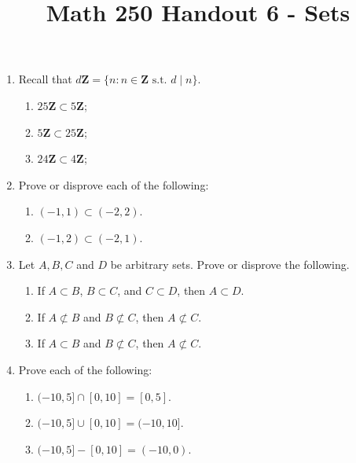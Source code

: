 \documentclass[12pt, reqno]{amsart}
\begin{document}
\title[Math 250 Handout 6 - Sets]{Math 250 Handout 6 - Sets}\maketitle

\begin{enumerate}
\item Recall that $d\mathbf{Z} = \{n : n \in \mathbf{Z} \text{ s.t. } d \mid n
 \}$.
 \begin{enumerate}
 \item $25\mathbf{Z} \subset 5 \mathbf{Z}$;
 \item $5\mathbf{Z} \subset 25\mathbf{Z}$;
 \item $24\mathbf{Z} \subset 4 \mathbf{Z}$; 

 \end{enumerate}
 \vspace{10pt}

\item Prove or disprove each of the following:
 \begin{enumerate}
 \item $(-1,1) \subset (-2,2)$. 
 \item $(-1,2) \subset (-2,1)$.
 \end{enumerate}
 \vspace{10pt} 

 
\item Let $A,B,C$ and $D$ be arbitrary sets. Prove or disprove the following.
 \begin{enumerate}
 \item If $A \subset B$, $B \subset C$, and $C \subset D$, then $A \subset D$.
 \item If $A \not \subset B$ and $B \not \subset C$, then $A \not \subset C$.
 \item If $A \subset B$ and $B \not \subset C$, then $A \not \subset C$.
 \end{enumerate}
\vspace{10pt}

\item Prove each of the following:
 \begin{enumerate}
 \item $(-10,5] \cap [0,10] = [0,5]$.
 \item $(-10,5] \cup [0,10] = (-10,10]$.
 \item $(-10,5] - [0,10] = (-10,0)$.
 \end{enumerate}


\end{enumerate}
\end{document}
